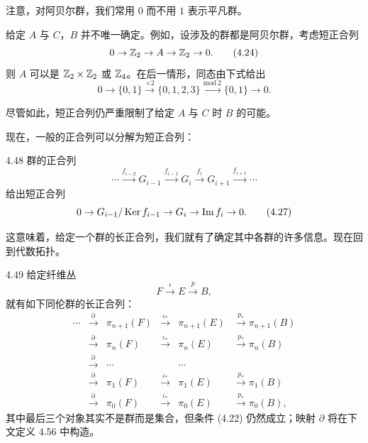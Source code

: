 注意，对阿贝尔群，我们常用 $0$ 而不用 $1$ 表示平凡群。

给定 $A$ 与 $C$，$B$ 并不唯一确定。例如，设涉及的群都是阿贝尔群，考虑短正合列
\begin{equation}
0\to\mathbb{Z}_2\to A\to\mathbb{Z}_2\to 0.
\tag{4.24}
\end{equation}
则 $A$ 可以是 $\mathbb{Z}_2\times\mathbb{Z}_2$ 或 $\mathbb{Z}_4$。在后一情形，同态由下式给出
\begin{equation}
0\to\{0,1\}\xrightarrow{\times 2}\{0,1,2,3\}\xrightarrow{\mathrm{mod}\,2}\{0,1\}\to 0.
\tag{4.25}
\end{equation}

尽管如此，短正合列仍严重限制了给定 $A$ 与 $C$ 时 $B$ 的可能。

现在，一般的正合列可以分解为短正合列：

\begin{proposition}{4.48}
群的正合列
\begin{equation}
\cdots\xrightarrow{f_{i-2}}G_{i-1}\xrightarrow{f_{i-1}}G_i\xrightarrow{f_i}G_{i+1}\xrightarrow{f_{i+1}}\cdots
\tag{4.26}
\end{equation}
给出短正合列
\begin{equation}
0\to G_{i-1}/\operatorname{Ker} f_{i-1}\to G_i\to\mathrm{Im}\,f_i\to 0.
\tag{4.27}
\end{equation}
\end{proposition}

这意味着，给定一个群的长正合列，我们就有了确定其中各群的许多信息。现在回到代数拓扑。

\begin{theorem}{4.49}
给定纤维丛
\begin{equation}
F\xrightarrow{\iota}E\xrightarrow{p}B,
\tag{4.28}
\end{equation}
就有如下同伦群的长正合列：
\begin{equation}
\begin{array}{cccccc}
\cdots & \xrightarrow{\partial} & \pi_{n+1}(F) & \xrightarrow{\iota_*} & \pi_{n+1}(E) & \xrightarrow{p_*}\pi_{n+1}(B)\\[2pt]
 & \xrightarrow{\partial} & \pi_{n}(F) & \xrightarrow{\iota_*} & \pi_{n}(E) & \xrightarrow{p_*}\pi_{n}(B)\\[2pt]
 & \xrightarrow{\partial} & \cdots & & \cdots & \\[2pt]
 & \xrightarrow{\partial} & \pi_{1}(F) & \xrightarrow{\iota_*} & \pi_{1}(E) & \xrightarrow{p_*}\pi_{1}(B)\\[2pt]
 & \xrightarrow{\partial} & \pi_{0}(F) & \xrightarrow{\iota_*} & \pi_{0}(E) & \xrightarrow{p_*}\pi_{0}(B),
\end{array}
\tag{4.29}
\end{equation}
其中最后三个对象其实不是群而是集合，但条件 (4.22) 仍然成立；映射 $\partial$ 将在下文定义 4.56 中构造。
\end{theorem}

